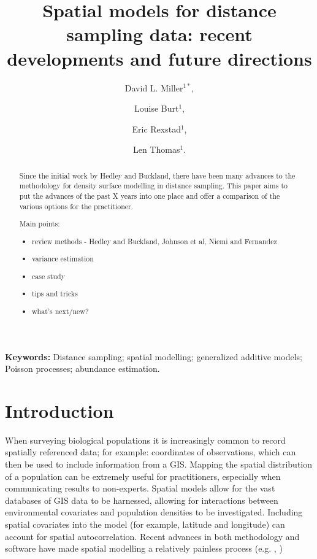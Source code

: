 \documentclass[a4paper,12pt]{article}
\title{Spatial models for distance sampling data: recent developments and future directions}
\author{
David L. Miller$^{1*}$, \and
Louise Burt$^{1}$, \and
Eric Rexstad$^{1}$, \and 
Len Thomas$^{1}$.}
\begin{document}
\maketitle


\begin{abstract}
  \noindent 
  Since the initial work by Hedley and Buckland, there have been many advances to the methodology for density surface modelling in distance sampling. This paper aims to put the advances of the past X years into one place and offer a comparison of the various options for the practitioner.

Main points:
\begin{itemize}
\item review methods - Hedley and Buckland, Johnson et al, Niemi and Fernandez
\item variance estimation
\item case study 
\item tips and tricks
\item what's next/new?
\end{itemize}
\end{abstract}

\noindent \textbf{Keywords:} Distance sampling; spatial modelling; generalized additive models; Poisson processes; abundance estimation.



\newpage


\section*{Introduction}

\label{s:intro}


When surveying biological populations it is increasingly common to record spatially referenced data; for example: coordinates of observations, which can then be used to include information from a GIS. Mapping the spatial distribution of a population can be extremely useful for practitioners, especially when communicating results to non-experts. Spatial models allow for the vast databases of GIS data to be harnessed, allowing for interactions between environmental covariates and population densities to be investigated. Including spatial covariates into the model (for example, latitude and longitude) can account for spatial autocorrelation. Recent advances in both methodology and software have made spatial modelling a relatively painless process (e.g. \cite{Wood:2006wz}, \cite{Rue:2009tw})
\end{document}
